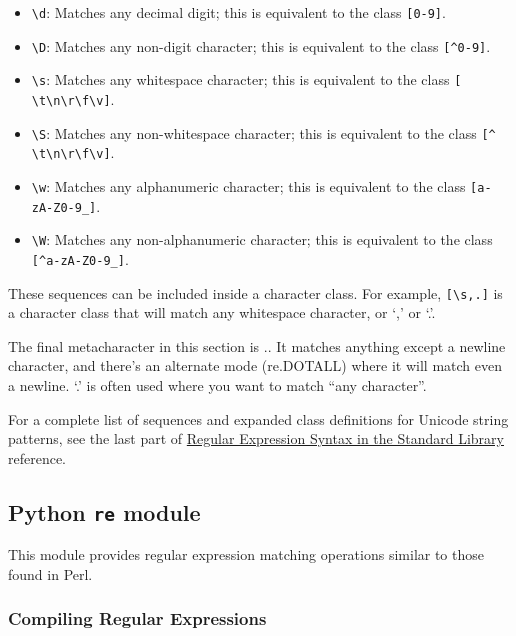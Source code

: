 \documentclass{article}
\begin{document}
\begin{itemize}
\item
  \texttt{\textbackslash{}d}: Matches any decimal digit; this is
  equivalent to the class \texttt{{[}0-9{]}}.
\item
  \texttt{\textbackslash{}D}: Matches any non-digit character; this is
  equivalent to the class \texttt{{[}\^{}0-9{]}}.
\item
  \texttt{\textbackslash{}s}: Matches any whitespace character; this is
  equivalent to the class
  \texttt{{[} \textbackslash{}t\textbackslash{}n\textbackslash{}r\textbackslash{}f\textbackslash{}v{]}}.
\item
  \texttt{\textbackslash{}S}: Matches any non-whitespace character; this
  is equivalent to the class
  \texttt{{[}\^{} \textbackslash{}t\textbackslash{}n\textbackslash{}r\textbackslash{}f\textbackslash{}v{]}}.
\item
  \texttt{\textbackslash{}w}: Matches any alphanumeric character; this
  is equivalent to the class \texttt{{[}a-zA-Z0-9\_{]}}.
\item
  \texttt{\textbackslash{}W}: Matches any non-alphanumeric character;
  this is equivalent to the class \texttt{{[}\^{}a-zA-Z0-9\_{]}}.
\end{itemize}

These sequences can be included inside a character class. For example,
\texttt{{[}\textbackslash{}s,.{]}} is a character class that will match
any whitespace character, or `,' or `.'.

The final metacharacter in this section is .. It matches anything except
a newline character, and there's an alternate mode (re.DOTALL) where it
will match even a newline. `.' is often used where you want to match
``any character''.

For a complete list of sequences and expanded class definitions for
Unicode string patterns, see the last part of
\href{https://docs.python.org/3.4/library/re.html\#re-syntax}{Regular
Expression Syntax in the Standard Library} reference.

    \subsection{Python \texttt{re} module}\label{python-re-module}

    This module provides regular expression matching operations similar to
those found in Perl.

    \subsubsection{Compiling Regular
Expressions}\label{compiling-regular-expressions}
\end{document}
